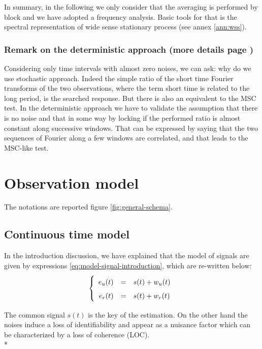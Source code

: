 In summary, in the following we only consider that the averaging is performed by block and we have adopted a frequency analysis. Basic tools for that is the spectral representation of wide sense stationary process (see annex \ref{ann:wss}).




\subsubsection{Remark on the deterministic approach (more details page \pageref{ann:deterministic-approach})}
Considering only time intervals with almost zero noises, we can ask: why do we use stochastic approach. Indeed the simple ratio of the short time Fourier transforms of the two observations, where the term short time is related to the long period, is the searched response. But there is also an equivalent to the MSC test. In the deterministic approach we have to validate the assumption that there is no noise and that in some way by locking if the performed ratio is almost constant along successive windows. That can be expressed by saying that the two sequences of Fourier along a few windows are correlated, and that leads to the MSC-like test.


\section{Observation model}
The notations are reported figure \ref{fig:general-schema}.  
\subsection{Continuous time model}

In the introduction discussion, we have explained that the model of signals are given by expressions \eqref{eq:model-signal-introduction}, which are re-written below:
\begin{eqnarray}
\label{eq:model-of-excitation}
\left\{
\renewcommand\arraystretch{1.6}
\begin{array}{rcl}
e_{\ut}(t)&=&s(t)+w_{\ut}(t)
\\
e_{\rf}(t)&=&s(t)+w_{\rf}(t)
\end{array}
\right.
\end{eqnarray}


The common signal $s(t)$ is the key of the estimation. On the other hand the noises induce a loss of identifiability and appear as a nuisance factor which can be characterized by a loss of coherence (LOC). \\*


